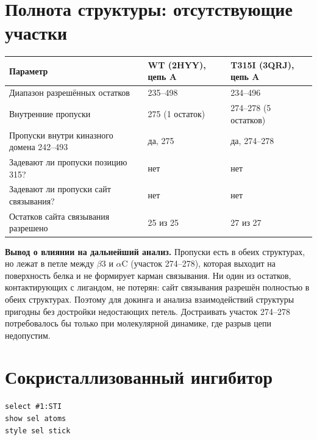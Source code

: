 \documentclass[12pt,a4paper]{article}
\begin{document}
\section{Полнота структуры: отсутствующие участки}

\begin{center}
\begin{tabular}{L{4.8cm}L{4.9cm}L{4.9cm}}
\toprule
\textbf{Параметр} & \textbf{WT (2HYY), цепь A} & \textbf{T315I (3QRJ), цепь A} \\
\midrule
Диапазон разрешённых остатков & 235--498 & 234--496 \\
Внутренние пропуски & 275 (1 остаток) & 274--278 (5 остатков) \\
Пропуски внутри киназного домена 242--493 & да, 275 & да, 274--278 \\
Задевают ли пропуски позицию 315? & нет & нет \\
Задевают ли пропуски сайт связывания? & нет & нет \\
Остатков сайта связывания разрешено & 25 из 25 & 27 из 27 \\
\bottomrule
\end{tabular}
\end{center}

\noindent\textbf{Вывод о влиянии на дальнейший анализ.} Пропуски есть в обеих
структурах, но лежат в петле между $\beta$3 и $\alpha$C (участок 274--278), которая
выходит на поверхность белка и не формирует карман связывания. Ни один из остатков,
контактирующих с лигандом, не потерян: сайт связывания разрешён полностью в обеих
структурах. Поэтому для докинга и анализа взаимодействий структуры пригодны без
достройки недостающих петель. Достраивать участок 274--278 потребовалось бы только
при молекулярной динамике, где разрыв цепи недопустим.

\section{Сокристаллизованный ингибитор}

\begin{verbatim}
select #1:STI
show sel atoms
style sel stick
\end{verbatim}
\end{document}
